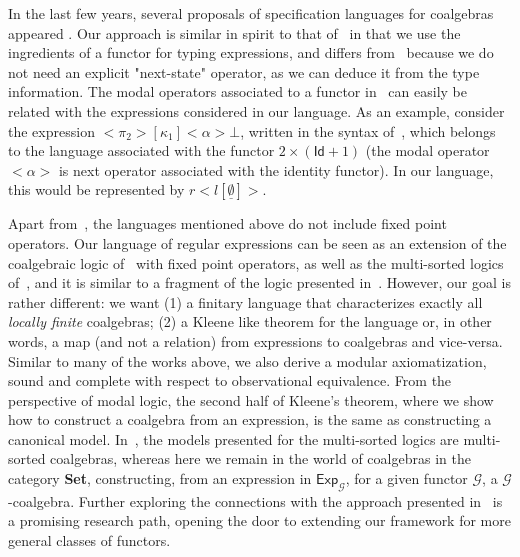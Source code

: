 \documentclass{LMCS}
\newcommand\Exp{\mathsf{Exp}}
\newcommand\id{\mathsf{Id}}
\newcommand\G{\mathcal{G}}
\newcommand\emp{\underline\emptyset}
\theoremstyle{definition}
\theoremstyle{plain}
\theoremstyle{plain}
\theoremstyle{plain}
\theoremstyle{plain}
\theoremstyle{definition}
\theoremstyle{definition}
\begin{document}
In the last few years, several proposals of specification languages
for coalgebras
appeared \cite{Moss99,Rossiger00,Jacobs01,Gol02,CirsteaP04,Bonsangue-Kurz05,Bonsangue-Kurz06,SP07,KV07}.
Our approach is similar in
spirit to that of~\cite{Gol02,Rossiger00,Jacobs01,SP07} in that we use the
ingredients of a functor for typing expressions, and differs
from~\cite{Rossiger00,Jacobs01} because we do not need an explicit "next-state"
operator, as we can deduce it from the type information. The modal operators associated to a functor
in~\cite{Rossiger00,Jacobs01,SP07} can easily be related with the
expressions considered in our language. As an example, consider the
expression $<\pi_2>[\kappa_1]<\alpha> \bot$, written in the syntax
of~\cite{Rossiger00}, which belongs to the language associated with the
functor $2\times (\id + 1)$ (the modal operator $<\alpha>$ is next
operator associated with the identity functor). In our language, this
would be represented by $r<l[\emp]>$.

Apart from~\cite{KV07}, the languages mentioned above do not include fixed point
operators. Our language of regular expressions can be seen as an
extension of the coalgebraic logic
of~\cite{Bonsangue-Kurz05} with fixed point operators, as well as the multi-sorted logics of~\cite{SP07}, and it is similar to a fragment of the
logic presented in~\cite{KV07}. However, our goal is rather
different: we want (1) a finitary language that characterizes
exactly all \emph{locally finite} coalgebras; (2) a Kleene like
theorem for the language or, in other words, a map (and not a
relation) from expressions to coalgebras and vice-versa. Similar to
many of the works above, we also derive a modular
axiomatization, sound and complete with respect to observational
equivalence. From the perspective of modal logic, the second half of
Kleene's theorem, where we show how to construct a coalgebra from an
expression, is the same as constructing a canonical model.
In~\cite{SP07}, the models presented for the multi-sorted logics are
multi-sorted coalgebras, whereas here we remain in the world of
coalgebras in the category  \textbf{Set}, constructing, from an
expression in $\Exp_\G$, for a given functor $\G$, a $\G$-coalgebra.
 Further exploring the connections with the approach presented
in~\cite{SP07} is a promising research path, opening the door to extending our framework for more general classes of functors.   
\end{document}
